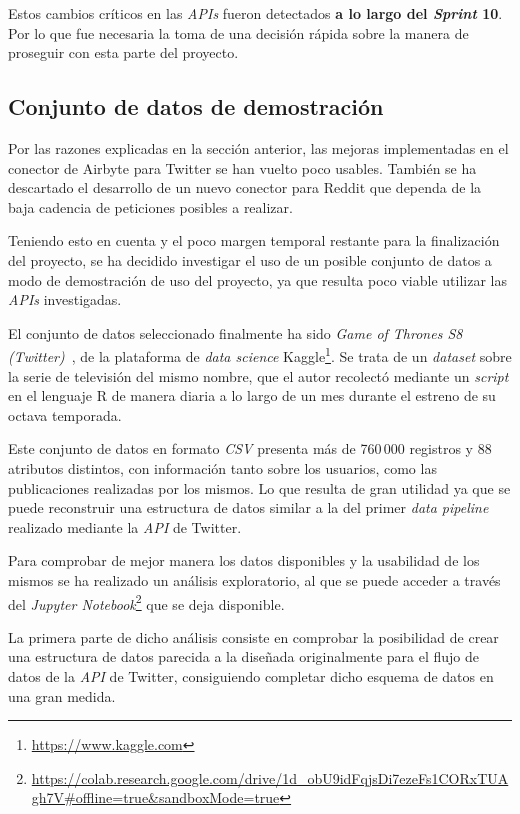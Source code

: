 Estos cambios críticos en las \textit{APIs} fueron detectados \textbf{a lo largo del \textit{Sprint} 10}. Por lo que fue necesaria la toma de una decisión rápida sobre la manera de proseguir con esta parte del proyecto.

\subsection{Conjunto de datos de demostración}

Por las razones explicadas en la sección anterior, las mejoras implementadas en el conector de Airbyte para Twitter se han vuelto poco usables. También se ha descartado el desarrollo de un nuevo conector para Reddit que dependa de la baja cadencia de peticiones posibles a realizar.

Teniendo esto en cuenta y el poco margen temporal restante para la finalización del proyecto, se ha decidido investigar el uso de un posible conjunto de datos a modo de demostración de uso del proyecto, ya que resulta poco viable utilizar las \textit{APIs} investigadas.

El conjunto de datos seleccionado finalmente ha sido \textit{Game of Thrones S8 (Twitter)}~\cite{got8}, de la plataforma de \textit{data science} Kaggle\footnote{\url{https://www.kaggle.com}}. Se trata de un \textit{dataset} sobre la serie de televisión del mismo nombre, que el autor recolectó mediante un \textit{script} en el lenguaje R de manera diaria a lo largo de un mes durante el estreno de su octava temporada.

Este conjunto de datos en formato \textit{CSV} presenta más de 760\,000 registros y 88 atributos distintos, con información tanto sobre los usuarios, como las publicaciones realizadas por los mismos. Lo que resulta de gran utilidad ya que se puede reconstruir una estructura de datos similar a la del primer \textit{data pipeline} realizado mediante la \textit{API} de Twitter.

Para comprobar de mejor manera los datos disponibles y la usabilidad de los mismos se ha realizado un análisis exploratorio, al que se puede acceder a través del \textit{Jupyter Notebook}\footnote{\url{https://colab.research.google.com/drive/1d_obU9idFqjsDi7ezeFs1CORxTUAgh7V\#offline=true&sandboxMode=true}} que se deja disponible.

La primera parte de dicho análisis consiste en comprobar la posibilidad de crear una estructura de datos parecida a la diseñada originalmente para el flujo de datos de la \textit{API} de Twitter, consiguiendo completar dicho esquema de datos en una gran medida.

